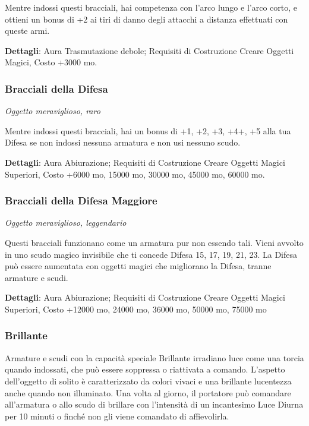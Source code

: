 \begin{multicols}{2}
Mentre indossi questi bracciali, hai competenza con l'arco lungo e l'arco corto, e ottieni un bonus di +2 ai tiri di danno degli attacchi a distanza effettuati con queste armi.

\textbf{Dettagli}: Aura Trasmutazione debole; Requisiti di Costruzione Creare Oggetti Magici, Costo +3000 mo.

\subsubsection*{Bracciali della Difesa}
\textit{Oggetto meraviglioso, raro}

Mentre indossi questi bracciali, hai un bonus di +1, +2, +3, +4+, +5 alla tua Difesa se non indossi nessuna armatura e non usi nessuno scudo.

\textbf{Dettagli}: Aura Abiurazione; Requisiti di Costruzione Creare Oggetti Magici Superiori, Costo +6000 mo, 15000 mo, 30000 mo, 45000 mo, 60000 mo.

\subsubsection*{Bracciali della Difesa Maggiore}
\textit{Oggetto meraviglioso, leggendario}

Questi bracciali funzionano come un armatura pur non essendo tali. Vieni avvolto in uno scudo magico invisibile che ti concede Difesa 15, 17, 19, 21, 23. La Difesa può essere aumentata con oggetti magici che migliorano la Difesa, tranne armature e scudi.

\textbf{Dettagli}: Aura Abiurazione; Requisiti di Costruzione Creare Oggetti Magici Superiori, Costo +12000 mo, 24000 mo, 36000 mo, 50000 mo, 75000 mo


\subsubsection*{Brillante}

Armature e scudi con la capacità speciale Brillante irradiano luce come una torcia quando indossati, che può essere soppressa o riattivata a comando. L'aspetto dell'oggetto di solito è caratterizzato da colori vivaci e una brillante lucentezza anche quando non illuminato. Una volta al giorno, il portatore può comandare all'armatura o allo scudo di brillare con l'intensità di un incantesimo Luce Diurna per 10 minuti o finché non gli viene comandato di affievolirla.


\end{multicols}
